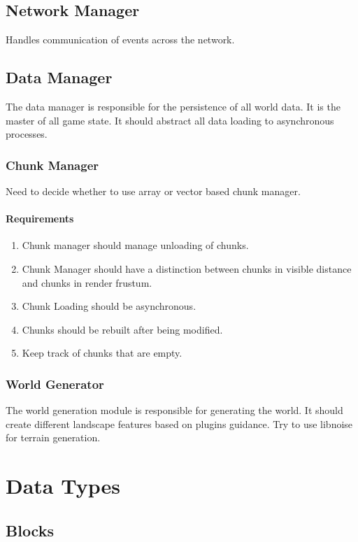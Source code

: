 \documentclass{article}
\begin{document}
\subsection{Network Manager}
Handles communication of events across the network.  
\subsection{Data Manager}
The data manager is responsible for the persistence of all world data.
It is the master of all game state.  It should abstract all data loading to asynchronous processes.

\subsubsection{Chunk Manager}
Need to decide whether to use array or vector based chunk manager.

\paragraph{Requirements}
\begin{enumerate}
\item 
Chunk manager should manage unloading of chunks.
\item
Chunk Manager should have a distinction between chunks in visible distance and chunks in render frustum.
\item 
Chunk Loading should be asynchronous.
\item
Chunks should be rebuilt after being modified.
\item
Keep track of chunks that are empty.
\end{enumerate}

\subsubsection{World Generator}
The world generation module is responsible for generating the world.
It should create different landscape features based on plugins guidance.
Try to use libnoise\cite{libnoise} for terrain generation.

\section{Data Types}
\subsection{Blocks}
\label{def:block}
\end{document}
